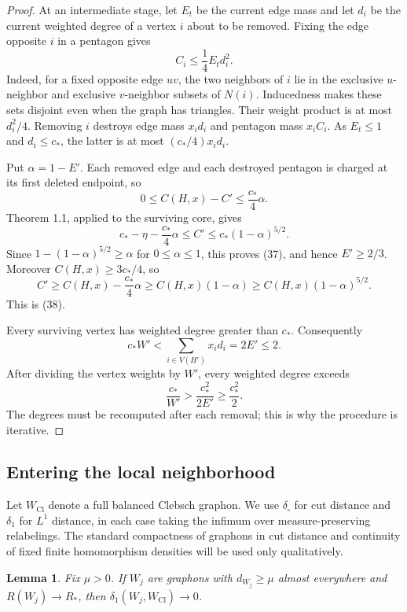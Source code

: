 \documentclass[11pt]{amsart}
\newtheorem{lemma}[theorem]{Lemma}
\theoremstyle{definition}
\theoremstyle{remark}
\begin{document}
\begin{proof}
At an intermediate stage, let $E_t$ be the current edge mass and let $d_i$
be the current weighted degree of a vertex $i$ about to be removed. Fixing
the edge opposite $i$ in a pentagon gives
\[
 C_i\leq\frac14 E_t d_i^2.
\]
Indeed, for a fixed opposite edge $uv$, the two neighbors of $i$ lie in the
exclusive $u$-neighbor and exclusive $v$-neighbor subsets of $N(i)$.
Inducedness makes these sets disjoint even when the graph has triangles.
Their weight product is at most $d_i^2/4$. Removing $i$ destroys edge mass
$x_i d_i$ and pentagon mass $x_i C_i$. As $E_t\leq1$ and $d_i\leq c_\ast$,
the latter is at most $(c_\ast/4)x_i d_i$.

Put $\alpha=1-E'$. Each removed edge and each destroyed pentagon is charged
at its first deleted endpoint, so
\begin{equation}\tag{40}\label{eq:40}
 0\leq C(H,x)-C'\leq\frac{c_\ast}4\alpha.
\end{equation}
Theorem 1.1, applied to the surviving core, gives
\[
 c_\ast-\eta-\frac{c_\ast}4\alpha\leq C'
 \leq c_\ast(1-\alpha)^{5/2}.
\]
Since $1-(1-\alpha)^{5/2}\geq\alpha$ for $0\leq\alpha\leq1$, this proves
(37), and hence $E'\geq2/3$. Moreover $C(H,x)\geq3c_\ast/4$, so
\[
 C'\geq C(H,x)-\frac{c_\ast}4\alpha
 \geq C(H,x)(1-\alpha)\geq C(H,x)(1-\alpha)^{5/2}.
\]
This is (38).

Every surviving vertex has weighted degree greater than $c_\ast$.
Consequently
\[
 c_\ast W'<\sum_{i\in V(H')}x_i d_i=2E'\leq2.
\]
After dividing the vertex weights by $W'$, every weighted degree exceeds
\[
 \frac{c_\ast}{W'}>\frac{c_\ast^2}{2E'}\geq\frac{c_\ast^2}2.
\]
The degrees must be recomputed after each removal; this is why the procedure
is iterative.
\end{proof}

\subsection{Entering the local neighborhood}
Let $W_{\mathrm{Cl}}$ denote a full balanced Clebsch graphon. We use
$\delta_\square$ for cut distance and $\delta_1$ for $L^1$ distance, in each
case taking the infimum over measure-preserving relabelings. The standard
compactness of graphons in cut distance and continuity of fixed finite
homomorphism densities will be used only qualitatively.

\begin{lemma}\label{lem:positive-degree-compactness}
Fix $\mu>0$. If $W_j$ are graphons with $d_{W_j}\geq\mu$ almost everywhere
and $R(W_j)\to R_\ast$, then $\delta_1(W_j,W_{\mathrm{Cl}})\to0$.
\end{lemma}
\end{document}
